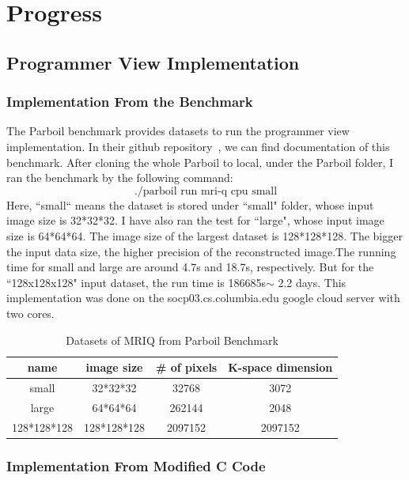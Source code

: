 \section{Progress}

\subsection{Programmer View Implementation}
\subsubsection{Implementation From the Benchmark}

The Parboil benchmark provides datasets to run the programmer view
implementation. In their github repository~\cite{Rub1}, we can find
documentation of this benchmark. After cloning the whole Parboil to local, under
the Parboil folder, I ran the benchmark by the following command:
$$\text{./parboil run mri-q cpu small}$$ Here, ``small“ means the dataset is
stored under ``small" folder, whose input image size is 32*32*32. I have also
ran the test for ``large", whose input image size is 64*64*64. The image size of
the largest dataset is 128*128*128.  The bigger the input data size, the higher
precision of the reconstructed image.The running time for small and large are
around 4.7s and 18.7s, respectively. But for the ``128x128x128" input dataset,
the run time is 186685s$ \sim$ 2.2 days. This implementation was done on the
socp03.cs.columbia.edu google cloud server with two cores.

\begin{table}[]
    \centering
    \begin{tabular}{c|c|c|c}
    \hline
    \hline
       name  & image size & \# of pixels & K-space dimension  \\
        \hline
    \hline
        small  & 32*32*32 & 32768 & 3072 \\
        large & 64*64*64 & 262144 & 2048\\
        128*128*128 & 128*128*128 & 2097152 & 2097152\\
        \hline
        \hline
    \end{tabular}
    \caption{Datasets of MRIQ from Parboil Benchmark}
    \label{tab-1}
\end{table}
\subsubsection{Implementation From Modified C Code}

